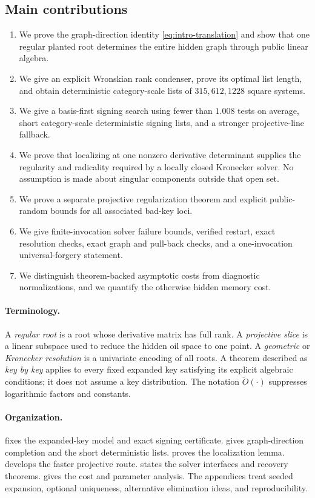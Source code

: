 \documentclass[11pt,a4paper]{article}
\theoremstyle{definition}
\theoremstyle{remark}
\begin{document}
\subsection*{Main contributions}
\begin{enumerate}
\item We prove the graph-direction identity \eqref{eq:intro-translation} and show that one regular planted root determines the entire hidden graph through public linear algebra.
\item We give an explicit Wronskian rank condenser, prove its optimal list length, and obtain deterministic category-scale lists of $315,612,1228$ square systems.
\item We give a basis-first signing search using fewer than $1.008$ tests on average, short category-scale deterministic signing lists, and a stronger projective-line fallback.
\item We prove that localizing at one nonzero derivative determinant supplies the regularity and radicality required by a locally closed Kronecker solver.  No assumption is made about singular components outside that open set.
\item We prove a separate projective regularization theorem and explicit public-random bounds for all associated bad-key loci.
\item We give finite-invocation solver failure bounds, verified restart, exact resolution checks, exact graph and pull-back checks, and a one-invocation universal-forgery statement.
\item We distinguish theorem-backed asymptotic costs from diagnostic normalizations, and we quantify the otherwise hidden memory cost.
\end{enumerate}

\paragraph{Terminology.}
A \emph{regular root} is a root whose derivative matrix has full rank.  A \emph{projective slice} is a linear subspace used to reduce the hidden oil space to one point.  A \emph{geometric} or \emph{Kronecker resolution} is a univariate encoding of all roots.  A theorem described as \emph{key by key} applies to every fixed expanded key satisfying its explicit algebraic conditions; it does not assume a key distribution.  The notation $\widetilde O(\cdot)$ suppresses logarithmic factors and constants.

\paragraph{Organization.}
 fixes the expanded-key model and exact signing certificate.   gives graph-direction completion and the short deterministic lists.   proves the localization lemma.   develops the faster projective route.   states the solver interfaces and recovery theorems.   gives the cost and parameter analysis.  The appendices treat seeded expansion, optional uniqueness, alternative elimination ideas, and reproducibility.
\end{document}
